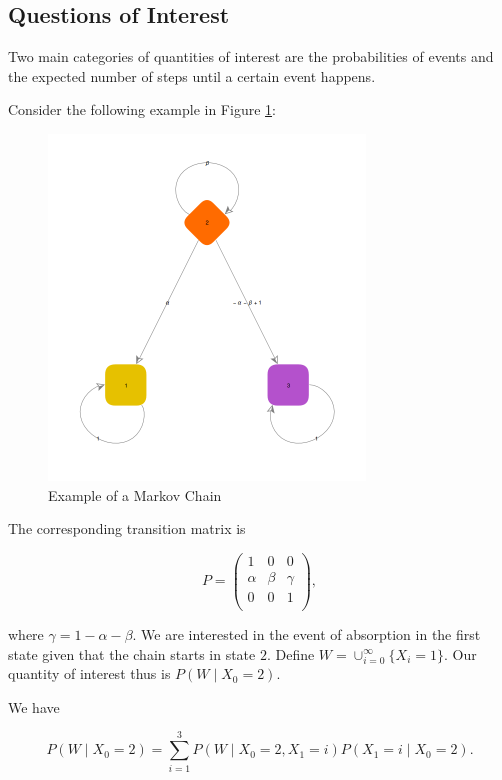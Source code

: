 \documentclass{article}
\theoremstyle{definition}
\begin{document}
\subsection{Questions of Interest}
Two main categories of quantities of interest are the probabilities of events and the expected number of steps until a certain event happens.

Consider the following example in Figure \ref{fig:interest_plot01}:

\begin{figure}[h!]
\centering
\includegraphics[width=0.75\textwidth]{images/interestPlot01}
\caption{Example of a Markov Chain}
\label{fig:interest_plot01}
\end{figure}

The corresponding transition matrix is

$$
P = \begin{pmatrix}
1 & 0 & 0 \\
\alpha & \beta & \gamma  \\
0 & 0 & 1 \\
\end{pmatrix},
$$

where $\gamma = 1 - \alpha - \beta$. We are interested in the event of absorption in the first state given that the chain starts in state $2$. Define $ W= \cup_{i=0}^\infty \{X_i = 1\}$. Our quantity of interest thus is $P(W \mid X_0 = 2)$.

We have

$$
P(W \mid X_0 = 2) = \sum_{i=1}^3 P(W \mid X_0 = 2, X_1 = i) P(X_1 = i \mid X_0 = 2).
$$
\end{document}
